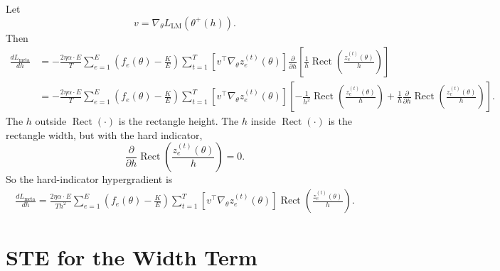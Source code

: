 \documentclass[11pt]{article}
\newcommand{\totalexperts}{E}
\newcommand{\activeexperts}{K}
\newcommand{\batchsize}{T}
\newcommand{\assignmentfraction}{f}
\newcommand{\modelparams}{\theta}
\newcommand{\lbcoef}{\alpha}
\newcommand{\bandwidth}{h}
\newcommand{\rect}{\operatorname{Rect}}
\begin{document}
Let
\[
  v =
  \nabla_{\modelparams}L_{\mathrm{LM}}(\modelparams^+(\bandwidth)).
\]
Then
\[
\begin{aligned}
  \frac{dL_{\mathrm{meta}}}{d\bandwidth}
  &=
  -\frac{2\eta\lbcoef \cdot \totalexperts}{\batchsize}
  \sum_{e=1}^{\totalexperts}
  \left(
    \assignmentfraction_e(\modelparams)
    -
    \frac{\activeexperts}{\totalexperts}
  \right)
  \sum_{t=1}^{\batchsize}
  \left[
    v^\top
    \nabla_{\modelparams}z_e^{(t)}(\modelparams)
  \right]
  \frac{\partial}{\partial\bandwidth}
  \left[
    \frac{1}{\bandwidth}
    \rect\!\left(
      \frac{z_e^{(t)}(\modelparams)}{\bandwidth}
    \right)
  \right] \\
  &=
  -\frac{2\eta\lbcoef \cdot \totalexperts}{\batchsize}
  \sum_{e=1}^{\totalexperts}
  \left(
    \assignmentfraction_e(\modelparams)
    -
    \frac{\activeexperts}{\totalexperts}
  \right)
  \sum_{t=1}^{\batchsize}
  \left[
    v^\top
    \nabla_{\modelparams}z_e^{(t)}(\modelparams)
  \right]
  \left[
    -\frac{1}{\bandwidth^2}
    \rect\!\left(
      \frac{z_e^{(t)}(\modelparams)}{\bandwidth}
    \right)
    +
    \frac{1}{\bandwidth}
    \frac{\partial}{\partial\bandwidth}
    \rect\!\left(
      \frac{z_e^{(t)}(\modelparams)}{\bandwidth}
    \right)
  \right].
\end{aligned}
\]
The $\bandwidth$ outside $\rect(\cdot)$ is the rectangle height.  The
$\bandwidth$ inside $\rect(\cdot)$ is the rectangle width, but with the hard
indicator,
\[
  \frac{\partial}{\partial\bandwidth}
  \rect\!\left(
    \frac{z_e^{(t)}(\modelparams)}{\bandwidth}
  \right)
  =
  0.
\]
So the hard-indicator hypergradient is
\[
\begin{aligned}
  \frac{dL_{\mathrm{meta}}}{d\bandwidth}
  =
  \frac{2\eta\lbcoef \cdot \totalexperts}
       {\batchsize\bandwidth^2}
  \sum_{e=1}^{\totalexperts}
  \left(
    \assignmentfraction_e(\modelparams)
    -
    \frac{\activeexperts}{\totalexperts}
  \right)
  \sum_{t=1}^{\batchsize}
  \left[
    v^\top
    \nabla_{\modelparams}z_e^{(t)}(\modelparams)
  \right]
  \rect\!\left(
    \frac{z_e^{(t)}(\modelparams)}{\bandwidth}
  \right).
\end{aligned}
\]

\section{STE for the Width Term}
\end{document}

